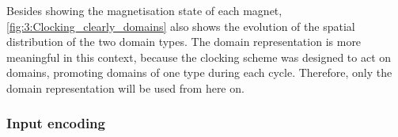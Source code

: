 Besides showing the magnetisation state of each magnet, \cref{fig:3:Clocking_clearly_domains} also shows the evolution of the spatial distribution of the two domain types.
The domain representation is more meaningful in this context, because the clocking scheme was designed to act on domains, promoting domains of one type during each cycle.
Therefore, only the domain representation will be used from here on.
\subsubsection{Input encoding} %
